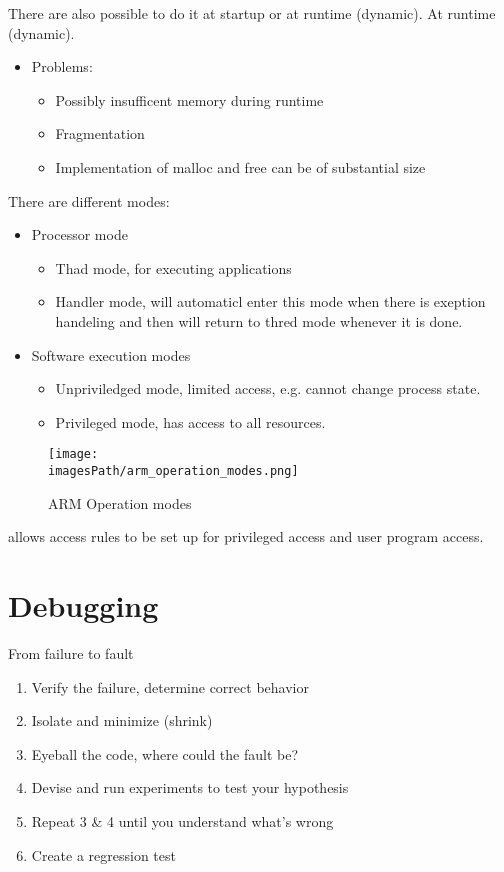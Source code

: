 There are also possible to do it at startup or at runtime (dynamic).
At runtime (dynamic).
\begin{itemize}
    \item Problems:
    \begin{itemize}
        \item Possibly insufficent memory during runtime
        \item Fragmentation
        \item Implementation of malloc and free can be of substantial size
    \end{itemize}
\end{itemize}

There are different modes: 
\begin{itemize}
    \item Processor mode
    \begin{itemize}
        \item Thad mode, for executing applications
        \item Handler mode, will automaticl enter this mode when there is exeption handeling and 
        then will return to thred mode whenever it is done.
    \end{itemize}
    \item Software execution modes
    \begin{itemize}
        \item Unpriviledged mode, limited access, e.g. cannot change process state.
        \item Privileged mode, has access to all resources.
    \end{itemize}
\end{itemize}

\begin{figure}[H]
    \centering
    \texttt{[image: \\imagesPath/arm\_operation\_modes.png]}
    \caption{ARM Operation modes}
    \label{fig:arm_operation_modes}
\end{figure}

 allows access rules to be set up for 
privileged access and user program access.



\section{Debugging}
From failure to fault
\begin{enumerate}
    \item Verify the failure, determine correct behavior
    \item Isolate and minimize (shrink)
    \item Eyeball the code, where could the fault be?
    \item Devise and run experiments to test your hypothesis
    \item Repeat 3 \& 4 until you understand what's wrong
    \item Create a regression test
\end{enumerate}

